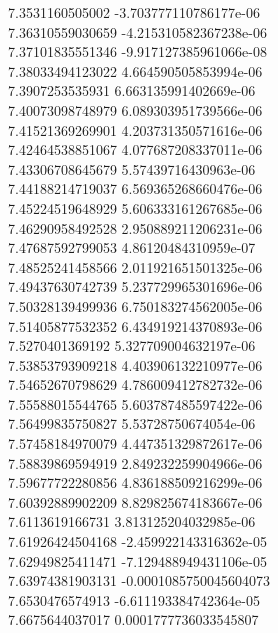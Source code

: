{7.3531160505002 -3.703777110786177e-06 \\
7.36310559030659 -4.215310582367238e-06 \\
7.37101835551346 -9.917127385961066e-08 \\
7.38033494123022 4.664590505853994e-06 \\
7.3907253535931 6.663135991402669e-06 \\
7.40073098748979 6.089303951739566e-06 \\
7.41521369269901 4.203731350571616e-06 \\
7.42464538851067 4.077687208337011e-06 \\
7.43306708645679 5.57439716430963e-06 \\
7.44188214719037 6.569365268660476e-06 \\
7.45224519648929 5.606333161267685e-06 \\
7.46290958492528 2.950889211206231e-06 \\
7.47687592799053 4.86120484310959e-07 \\
7.48525241458566 2.011921651501325e-06 \\
7.49437630742739 5.237729965301696e-06 \\
7.50328139499936 6.750183274562005e-06 \\
7.51405877532352 6.434919214370893e-06 \\
7.5270401369192 5.327709004632197e-06 \\
7.53853793909218 4.403906132210977e-06 \\
7.54652670798629 4.786009412782732e-06 \\
7.55588015544765 5.603787485597422e-06 \\
7.56499835750827 5.53728750674054e-06 \\
7.57458184970079 4.447351329872617e-06 \\
7.58839869594919 2.849232259904966e-06 \\
7.59677722280856 4.836188509216299e-06 \\
7.60392889902209 8.829825674183667e-06 \\
7.6113619166731 3.813125204032985e-06 \\
7.61926424504168 -2.459922143316362e-05 \\
7.62949825411471 -7.129488949431106e-05 \\
7.63974381903131 -0.0001085750045604073 \\
7.6530476574913 -6.611193384742364e-05 \\
7.6675644037017 0.0001777736033545807 \\
}
